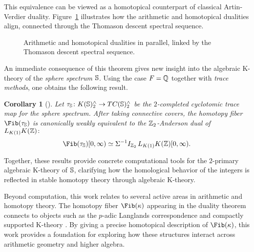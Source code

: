 \documentclass[11pt]{article}
\newtheorem{corollary}[theorem]{Corollary}
\begin{document}
This equivalence can be viewed as a homotopical counterpart of classical Artin-Verdier duality.
Figure~\ref{fig:duality} illustrates how the arithmetic and homotopical dualities align, connected through the Thomason descent spectral sequence.
\begin{figure}[h]
\centering
{}
\captionsetup{font=footnotesize, skip=0em}
\caption{
Arithmetic and homotopical dualities in parallel,
linked by the Thomason descent spectral sequence.
}
\label{fig:duality}
\end{figure}

An immediate consequence of this theorem gives new insight into the algebraic K-theory of the {\it sphere spectrum} $\mathbb{S}$.
Using the case $F=\mathbb{Q}$ together with {\it trace methods}, one obtains the following result.

\begin{corollary}[\cite{Cho}]
Let $\tau_{\mathbb{S}}\colon K(\mathbb{S})_2^\wedge \to TC(\mathbb{S})_2^\wedge$ be the $2$-completed cyclotomic trace map for the sphere spectrum.
After taking connective covers, the homotopy fiber $\Fib(\ta_\bS)$ is canonically weakly equivalent to the $\mathbb{Z}_2$-Anderson dual of $L_{K(1)}K(\mathbb{Z})\colon$
\[\Fib(\ta_\bS)[0,\infty) \simeq \Sigma^{-1} I_{\bZ_2}\, L_{K(1)}K(\bZ)[0,\infty).\]
\end{corollary}
Together, these results provide concrete computational tools for the $2$-primary algebraic K-theory of $\mathbb{S}$, clarifying how the homological behavior of the integers is reflected in stable homotopy theory through algebraic K-theory.

Beyond computation, this work relates to several active areas in arithmetic and homotopy theory.
The homotopy fiber $\Fib(\kappa)$ appearing in the duality theorem connects to objects such as the $p$-adic Langlands correspondence \cite{MR2905536} and compactly supported K-theory \cite{MR3211458}.
By giving a precise homotopical description of $\Fib(\kappa)$, this work provides a foundation for exploring how these structures interact across arithmetic geometry and higher algebra.
\end{document}
